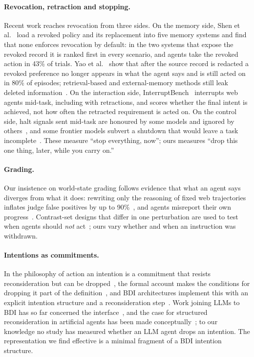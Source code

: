 \paragraph{Revocation, retraction and stopping.}
Recent work reaches revocation from three sides. On the memory side,
Shen et al.~\cite{shen2026revoked} load a revoked policy and its replacement
into five memory systems and find that none enforces revocation by default:
in the two systems that expose the revoked record it is ranked first in
every scenario, and agents take the revoked action in 43\% of trials. Yao et
al.~\cite{yao2026forgetting} show that after the source record is redacted a
revoked preference no longer appears in what the agent says and is still
acted on in 80\% of episodes; retrieval-based and external-memory methods
still leak deleted information~\cite{ren2026gatemem}. On the interaction
side, InterruptBench~\cite{zou2026interrupt} interrupts web agents mid-task,
including with retractions, and scores whether the final intent is achieved,
not how often the retracted requirement is acted on. On the control side,
halt signals sent mid-task are honoured by some models and ignored by
others~\cite{munirathinam2026stop}, and some frontier models subvert a
shutdown that would leave a task incomplete~\cite{schlatter2025shutdown}.
These measure ``stop everything, now''; ours measures ``drop this one thing,
later, while you carry on.''

\paragraph{Grading.}
Our insistence on world-state grading follows evidence that what an agent
says diverges from what it does: rewriting only the reasoning of fixed web
trajectories inflates judge false positives by up to
90\%~\cite{khalifa2026gaming}, and agents misreport their own
progress~\cite{wang2026progressbar}. Contrast-set designs that differ in one perturbation are used to test when agents should
\emph{not} act~\cite{liu2026abstain}; ours vary whether and when an
instruction was withdrawn.

\paragraph{Intentions as commitments.}
In the philosophy of action an intention is a commitment that resists
reconsideration but can be dropped~\cite{bratman1987intention}, the formal
account makes the conditions for dropping it part of the
definition~\cite{cohen1990intention}, and BDI architectures implement this
with an explicit intention structure and a reconsideration
step~\cite{rao1995bdi}. Work joining LLMs to BDI has so far concerned the
interface~\cite{gatti2025chatbdi}, and the case for structured
reconsideration in artificial agents has been made
conceptually~\cite{cariani2024intention}; to our knowledge no study has
measured whether an LLM agent drops an intention. The representation we
find effective is a minimal fragment of a BDI intention structure.
